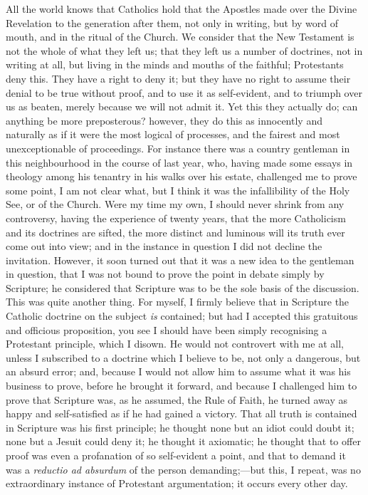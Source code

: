 All the world knows that Catholics hold that the
Apostles made over the Divine Revelation to the
generation after them, not only in writing, but by word
of mouth, and in the ritual of the Church. We consider
that the New Testament is not the whole of what they left
us; that they left us a number of doctrines, not in
writing at all, but living in the minds and mouths of the
faithful; Protestants deny this. They have a right to
deny it; but they have no right to assume their denial to
be true without proof, and to use it as self-evident, and
to triumph over us as beaten, merely because we will not
admit it. Yet this they actually do; can anything be more
preposterous? however, they do this as innocently and
naturally as if it were the most logical of processes,
and the fairest and most unexceptionable of proceedings.
For instance there was a country gentleman in this
neighbourhood in the course of last year, who, having
made some essays in theology among his tenantry in his
walks over his estate, challenged me to prove some point,
I am not clear what, but I think it was the infallibility
of the Holy See, or of the Church. Were my time my own, I
should never shrink from any controversy, having the
experience of twenty years, that the more Catholicism and
its doctrines are sifted, the more distinct and luminous
will its truth ever come out into view; and in the
instance in question I did not decline the invitation.
However, it soon turned out that it was a new idea to the
gentleman in question, that I was not bound to prove the
point in debate simply by Scripture; he considered that
Scripture was to be the sole basis of the discussion.
This was quite another thing. For myself, I firmly
believe that in Scripture the Catholic doctrine on the
subject \emph{is} contained; but had I accepted this gratuitous
and officious proposition, you see I should have been
simply recognising a Protestant principle, which I
disown. He would not controvert with me at all, unless I
subscribed to a doctrine which I believe to be, not only
a dangerous, but an absurd error; and, because I would
not allow him to assume what it was his business to
prove, before he brought it forward, and because I
challenged him to prove that Scripture was, as he
assumed, the Rule of Faith, he turned away as happy and
self-satisfied as if he had gained a victory. That all
truth is contained in Scripture was his first principle;
he thought none but an idiot could doubt it; none but a
Jesuit could deny it; he thought it axiomatic; he thought
that to offer proof was even a profanation of so
self-evident a point, and that to demand it was a \emph{reductio
ad absurdum} of the person demanding;—but this, I
repeat, was no extraordinary instance of Protestant
argumentation; it occurs every other day.

